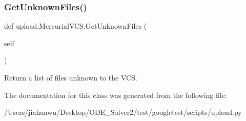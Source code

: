 \subsubsection{\texorpdfstring{Get\+Unknown\+Files()}{GetUnknownFiles()}}
{\footnotesize\ttfamily def upload.\+Mercurial\+V\+C\+S.\+Get\+Unknown\+Files (\begin{DoxyParamCaption}\item[{}]{self }\end{DoxyParamCaption})}

\begin{DoxyVerb}Return a list of files unknown to the VCS.\end{DoxyVerb}
 

The documentation for this class was generated from the following file\+:\begin{DoxyCompactItemize}
\item 
/\+Users/jiahuawu/\+Desktop/\+O\+D\+E\+\_\+\+Solver2/test/googletest/scripts/upload.\+py\end{DoxyCompactItemize}
